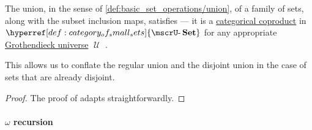 \begin{proposition}\label{thm:disjoint_union_of_disjoint_sets}
  The union, in the sense of \cref{def:basic_set_operations/union}, of a family of \hyperref[def:subset_ordering]{} sets, along with the subset inclusion maps, satisfies  --- it is a \hyperref[def:discrete_category_limits]{categorical coproduct} in \( \hyperref[def:category_of_small_sets]{\ucat{Set}} \) for any appropriate \hyperref[def:grothendieck_universe]{Grothendieck universe} \( \mscrU \) .
\end{proposition}
\begin{comments}
  \item This allows us to conflate the regular union and the disjoint union in the case of sets that are already disjoint.
\end{comments}
\begin{proof}
  The proof of  adapts straightforwardly.
\end{proof}

\paragraph{\( \omega \) recursion}

